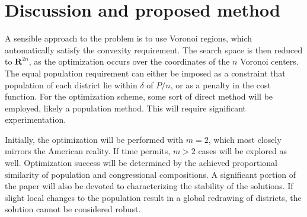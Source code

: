 \documentclass{article}
\begin{document}
\section*{Discussion and proposed method}
A sensible approach to the problem is to use Voronoi regions, which automatically satisfy the convexity requirement. The search space is then reduced to $\mathbf{R}^{2n}$, as the optimization occurs over the coordinates of the $n$ Voronoi centers. The equal population requirement can either be imposed as a constraint that population of each district lie within $\delta$ of $P/n$, or as a penalty in the cost function. For the optimization scheme, some sort of direct method will be employed, likely a population method. This will require significant experimentation. 

Initially, the optimization will be performed with $m = 2$, which most closely mirrors the American reality. If time permits, $m > 2$ cases will be explored as well. Optimization success will be determined by the achieved proportional similarity of population and congressional compositions. A significant portion of the paper will also be devoted to characterizing the stability of the solutions. If slight local changes to the population result in a global redrawing of districts, the solution cannot be considered robust.
\end{document}
